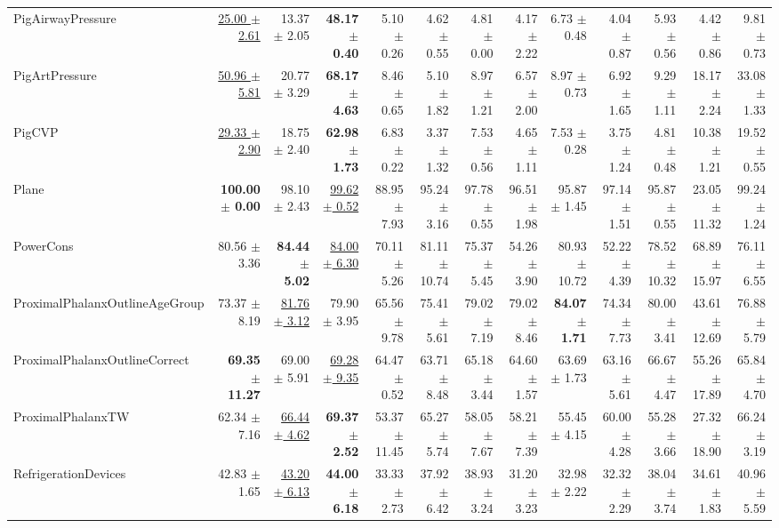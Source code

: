 \begin{landscape}
\begin{longtable}{lrrrrrrrrrrrr}
PigAirwayPressure & \underline{25.00 $\pm$ 2.61} & 13.37 $\pm$ 2.05 & \textbf{48.17 $\pm$ 0.40} & 5.10 $\pm$ 0.26 & 4.62 $\pm$ 0.55 & 4.81 $\pm$ 0.00 & 4.17 $\pm$ 2.22 & 6.73 $\pm$ 0.48 & 4.04 $\pm$ 0.87 & 5.93 $\pm$ 0.56 & 4.42 $\pm$ 0.86 & 9.81 $\pm$ 0.73 \\
PigArtPressure & \underline{50.96 $\pm$ 5.81} & 20.77 $\pm$ 3.29 & \textbf{68.17 $\pm$ 4.63} & 8.46 $\pm$ 0.65 & 5.10 $\pm$ 1.82 & 8.97 $\pm$ 1.21 & 6.57 $\pm$ 2.00 & 8.97 $\pm$ 0.73 & 6.92 $\pm$ 1.65 & 9.29 $\pm$ 1.11 & 18.17 $\pm$ 2.24 & 33.08 $\pm$ 1.33 \\
PigCVP & \underline{29.33 $\pm$ 2.90} & 18.75 $\pm$ 2.40 & \textbf{62.98 $\pm$ 1.73} & 6.83 $\pm$ 0.22 & 3.37 $\pm$ 1.32 & 7.53 $\pm$ 0.56 & 4.65 $\pm$ 1.11 & 7.53 $\pm$ 0.28 & 3.75 $\pm$ 1.24 & 4.81 $\pm$ 0.48 & 10.38 $\pm$ 1.21 & 19.52 $\pm$ 0.55 \\
Plane & \textbf{100.00 $\pm$ 0.00} & 98.10 $\pm$ 2.43 & \underline{99.62 $\pm$ 0.52} & 88.95 $\pm$ 7.93 & 95.24 $\pm$ 3.16 & 97.78 $\pm$ 0.55 & 96.51 $\pm$ 1.98 & 95.87 $\pm$ 1.45 & 97.14 $\pm$ 1.51 & 95.87 $\pm$ 0.55 & 23.05 $\pm$ 11.32 & 99.24 $\pm$ 1.24 \\
PowerCons & 80.56 $\pm$ 3.36 & \textbf{84.44 $\pm$ 5.02} & \underline{84.00 $\pm$ 6.30} & 70.11 $\pm$ 5.26 & 81.11 $\pm$ 10.74 & 75.37 $\pm$ 5.45 & 54.26 $\pm$ 3.90 & 80.93 $\pm$ 10.72 & 52.22 $\pm$ 4.39 & 78.52 $\pm$ 10.32 & 68.89 $\pm$ 15.97 & 76.11 $\pm$ 6.55 \\
ProximalPhalanxOutlineAgeGroup & 73.37 $\pm$ 8.19 & \underline{81.76 $\pm$ 3.12} & 79.90 $\pm$ 3.95 & 65.56 $\pm$ 9.78 & 75.41 $\pm$ 5.61 & 79.02 $\pm$ 7.19 & 79.02 $\pm$ 8.46 & \textbf{84.07 $\pm$ 1.71} & 74.34 $\pm$ 7.73 & 80.00 $\pm$ 3.41 & 43.61 $\pm$ 12.69 & 76.88 $\pm$ 5.79 \\
ProximalPhalanxOutlineCorrect & \textbf{69.35 $\pm$ 11.27} & 69.00 $\pm$ 5.91 & \underline{69.28 $\pm$ 9.35} & 64.47 $\pm$ 0.52 & 63.71 $\pm$ 8.48 & 65.18 $\pm$ 3.44 & 64.60 $\pm$ 1.57 & 63.69 $\pm$ 1.73 & 63.16 $\pm$ 5.61 & 66.67 $\pm$ 4.47 & 55.26 $\pm$ 17.89 & 65.84 $\pm$ 4.70 \\
ProximalPhalanxTW & 62.34 $\pm$ 7.16 & \underline{66.44 $\pm$ 4.62} & \textbf{69.37 $\pm$ 2.52} & 53.37 $\pm$ 11.45 & 65.27 $\pm$ 5.74 & 58.05 $\pm$ 7.67 & 58.21 $\pm$ 7.39 & 55.45 $\pm$ 4.15 & 60.00 $\pm$ 4.28 & 55.28 $\pm$ 3.66 & 27.32 $\pm$ 18.90 & 66.24 $\pm$ 3.19 \\
RefrigerationDevices & 42.83 $\pm$ 1.65 & \underline{43.20 $\pm$ 6.13} & \textbf{44.00 $\pm$ 6.18} & 33.33 $\pm$ 2.73 & 37.92 $\pm$ 6.42 & 38.93 $\pm$ 3.24 & 31.20 $\pm$ 3.23 & 32.98 $\pm$ 2.22 & 32.32 $\pm$ 2.29 & 38.04 $\pm$ 3.74 & 34.61 $\pm$ 1.83 & 40.96 $\pm$ 5.59 \\

\end{longtable}
\end{landscape}
